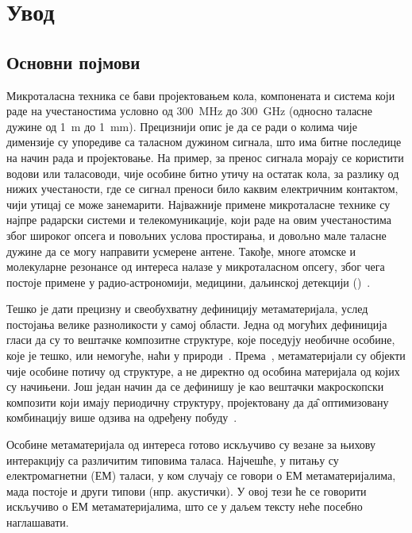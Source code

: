 \documentclass[main.tex]{subfiles}
\begin{document}
\chapter{Увод}


\section{Основни појмови}

Микроталасна техника се бави пројектовањем кола, компонената и система који раде на учестаностима условно од \SI{300}{\mega\hertz} до \SI{300}{\giga\hertz} (односно таласне дужине од \SI{1}{\meter} до \SI{1}{\milli\meter}). Прецизнији опис је да се ради о колима чије димензије су упоредиве са таласном дужином сигнала, што има битне последице на начин рада и пројектовање. На пример, за пренос сигнала морају се користити водови или таласоводи, чије особине битно утичу на остатак кола, за разлику од нижих учестаности, где се сигнал преноси било каквим електричним контактом, чији утицај се може занемарити. Најважније примене микроталасне технике су најпре радарски системи и телекомуникације, који раде на овим учестаностима због широког опсега и повољних услова простирања, и довољно мале таласне дужине да се могу направити усмерене антене. Такође, многе атомске и молекуларне резонансе од интереса налазе у микроталасном опсегу, због чега постоје примене у радио-астрономији, медицини, даљинској детекцији ()~\cite{djordjevic2005mikrotalasna,pozar2009microwave}.

Тешко је дати прецизну и свеобухватну дефиницију метаматеријала, услед постојања велике разноликости у самој области. Једна од могућих дефиниција гласи да су то вештачке композитне структуре, које поседују необичне особине, које је тешко, или немогуће, наћи у природи~\cite{Sham:09}. Према~\cite{sihvola2007metamaterials}, метаматеријали су објекти чије особине потичу од структуре, а не директно од особина материјала од којих су начињени. Још један начин да се дефинишу је као вештачки макроскопски композити који имају периодичну структуру, пројектовану да д\^{а} оптимизовану комбинацију више одзива на одређену побуду~\cite{jokanovic2010metamaterials}.%

Особине метаматеријала од интереса готово искључиво су везане за њихову интеракцију са различитим типовима таласа. Најчешће, у питању су електромагнетни (ЕМ) таласи, у ком случају се говори о ЕМ метаматеријалима, мада постоје и други типови (нпр. акустички). У овој тези ће се говорити искључиво о ЕМ метаматеријалима, што се у даљем тексту неће посебно наглашавати.
\end{document}
